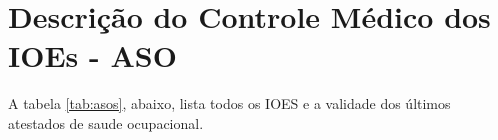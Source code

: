 \chapter{Descrição do Controle Médico dos IOEs - ASO}
\label{ch:descricao_controle-medico}
A tabela \ref{tab:asos}, abaixo, lista todos os IOES e a validade dos últimos atestados de saude ocupacional.

\begin{table}[!ht]
    \centering
    \caption{Controle de Atestado de Saúde Ocupacional.}
    \label{tab:asos}
\end{table}

